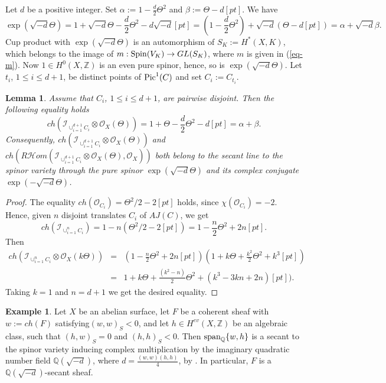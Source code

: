 \documentclass[12pt]{amsart}
\numberwithin{equation}{subsection}
\theoremstyle{plain}
\newtheorem{lem}[thm]{Lemma}
\theoremstyle{definition}
\newtheorem{example}[thm]{Example}
\newcommand{\QQ}{{\mathbb Q}}
\newcommand{\ZZ}{{\mathbb Z}}
\newcommand{\Spin}{{\rm Spin}}
\newcommand{\StructureSheaf}[1]{{\mathcal O}_{#1}}
\newcommand{\Pic}{{\rm Pic}}
\newcommand{\SheafHom}{{\mathcal H}om}
\newcommand{\Ideal}[1]{{\mathcal I}_{#1}}
\renewcommand{\span}{{\rm span}}
\begin{document}
Let $d$ be a positive integer. Set $\alpha:=1-\frac{d}{2}\Theta^2$ and $\beta:=\Theta-d[pt]$. We have
\[
\exp(\sqrt{-d}\Theta)=1+\sqrt{-d}\Theta-\frac{d}{2}\Theta^2-d\sqrt{-d}[pt]=
\left(1-\frac{d}{2}\Theta^2\right)+\sqrt{-d}\left(\Theta-d[pt]\right)=\alpha+\sqrt{-d}\beta.
\]
Cup product with $\exp(\sqrt{-d}\Theta)$ is an automorphism of $S_K:=H^*(X,K)$, which belongs to the image of $m:\Spin(V_K)\rightarrow GL(S_K)$,
where $m$ is given in (\ref{eq-m}). Now $1\in H^0(X,\ZZ)$ is an even pure spinor, hence, so is $\exp(\sqrt{-d}\Theta)$.
Let $t_i$, $1\leq i\leq d+1$, be distinct points of $\Pic^1(C)$ and set $C_i:=C_{t_i}$. 

\begin{lem}
\label{lemma-ch-F-i-is-on-secant-to-spinor-variety}
Assume that $C_i$, $1\leq i\leq d+1$, are pairwise disjoint. Then the following equality holds
\[
ch\left(\Ideal{\cup_{i=1}^{d+1}C_i}\otimes\StructureSheaf{X}(\Theta)\right)=
1+\Theta-\frac{d}{2}\Theta^2-d[pt]=\alpha+\beta.
\]
Consequently, $ch\left(\Ideal{\cup_{i=1}^{d+1}C_i}\otimes\StructureSheaf{X}(\Theta)\right)$ 
and $ch\left(R\SheafHom(\Ideal{\cup_{i=1}^{d+1}C_i}\otimes\StructureSheaf{X}(\Theta),\StructureSheaf{X})\right)$ 
both belong to the secant line to the spinor variety through the pure spinor $\exp(\sqrt{-d}\Theta)$ and its complex conjugate $\exp(-\sqrt{-d}\Theta)$.
\end{lem}

\begin{proof}
The equality $ch(\StructureSheaf{C_i})=\Theta^2/2-2[pt]$ holds, since $\chi(\StructureSheaf{C_i})=-2$.
Hence, given $n$ disjoint translates $C_i$ of $AJ(C)$, we get
\[
ch(\Ideal{\cup_{i=1}^nC_i})=1-n\left(\Theta^2/2-2[pt]\right)=1-\frac{n}{2}\Theta^2+2n[pt].
\]
Then 
\begin{eqnarray*}
ch(\Ideal{\cup_{i=1}^nC_i}\otimes\StructureSheaf{X}(k\Theta))&=&
(1-\frac{n}{2}\Theta^2+2n[pt])(1+k\Theta+\frac{k^2}{2}\Theta^2+k^3[pt])
\\
&=&1+k\Theta+\frac{(k^2-n)}{2}\Theta^2+(k^3-3kn+2n)[pt]).
\end{eqnarray*}
Taking $k=1$ and $n=d+1$ we get the desired equality.
\end{proof}

\begin{example}
Let $X$ be an abelian surface, let $F$ be a coherent sheaf with $w:=ch(F)$ satisfying$(w,w)_S<0$, and let
$h\in H^{ev}(X,\ZZ)$ be an algebraic class, such that $(h,w)_S=0$ and  $(h,h)_S<0$. Then $\span_\QQ\{w,h\}$ is a secant to the spinor variety inducing complex multiplication by the imaginary quadratic number field $\QQ(\sqrt{-d})$, where $d=\frac{(w,w)(h,h)}{4}$, by \cite[Prop. 1.7]{markman-generalized-kummers}. In particular, $F$ is a $\QQ(\sqrt{-d})$-secant sheaf.
\end{example}
\end{document}
